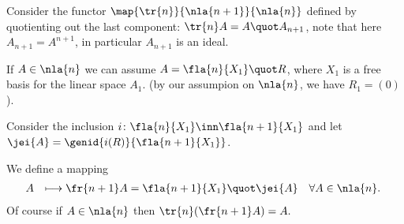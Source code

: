 Consider the functor $\map{\tr{n}}{\nla{n+1}}{\nla{n}}$ defined by quotienting out the last component:
$\tr{n}A=A\quot A_{n+1}$, note that here $A_{n+1}=A^{n+1}$, in particular $A_{n+1}$ is an ideal.

If $A\in\nla{n}$ we can assume $A=\fla{n}{X_1}\quot R$, where $X_1$ is a free basis for the linear space $A_1$.
(by our assumpion on $\nla{n}$, we have $R_{1}=(0)$).

Consider the %
inclusion $i\colon\fla{n}{X_{1}}%
\inn\fla{n+1}{X_{1}}$ and
let $\jei{A}=\genid{i(R)}{\fla{n+1}{X_{1}}}$.

We define a mapping
\begin{eqnarray*}
&\!\!A&\longmapsto\fr{n+1}A=\fla{n+1}{X_1}\quot\jei{A}%
\quad\forall A\in\nla{n}.
\end{eqnarray*}
Of course if $A\in\nla{n}$ then $\tr{n}(\fr{n+1}A)=A.$

